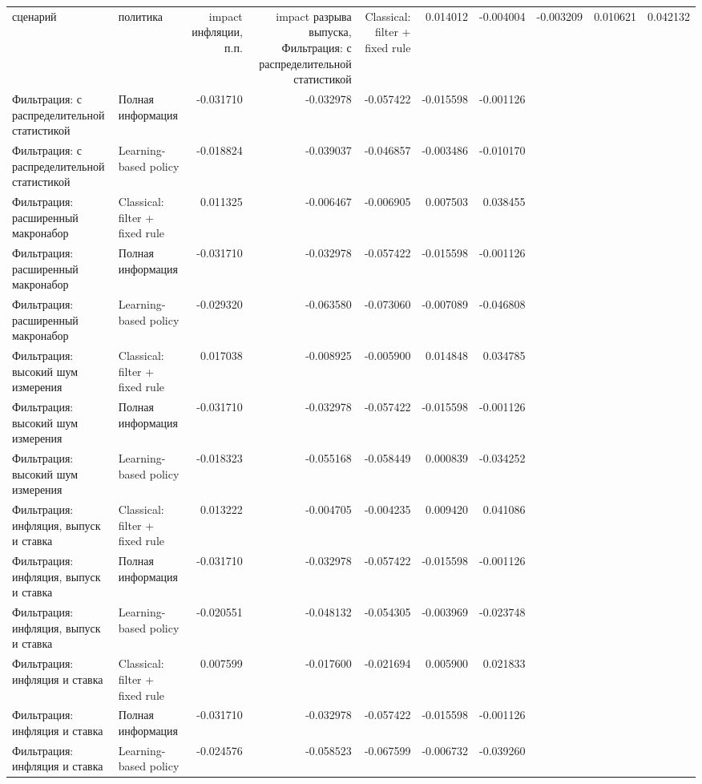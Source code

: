 \begin{tabular}{llrrrrr}
\toprule
сценарий & политика & impact инфляции, п.п. & impact разрыва выпуска, %
\midrule
Фильтрация: с распределительной статистикой & Classical: filter + fixed rule & 0.014012 & -0.004004 & -0.003209 & 0.010621 & 0.042132 \\
Фильтрация: с распределительной статистикой & Полная информация & -0.031710 & -0.032978 & -0.057422 & -0.015598 & -0.001126 \\
Фильтрация: с распределительной статистикой & Learning-based policy & -0.018824 & -0.039037 & -0.046857 & -0.003486 & -0.010170 \\
Фильтрация: расширенный макронабор & Classical: filter + fixed rule & 0.011325 & -0.006467 & -0.006905 & 0.007503 & 0.038455 \\
Фильтрация: расширенный макронабор & Полная информация & -0.031710 & -0.032978 & -0.057422 & -0.015598 & -0.001126 \\
Фильтрация: расширенный макронабор & Learning-based policy & -0.029320 & -0.063580 & -0.073060 & -0.007089 & -0.046808 \\
Фильтрация: высокий шум измерения & Classical: filter + fixed rule & 0.017038 & -0.008925 & -0.005900 & 0.014848 & 0.034785 \\
Фильтрация: высокий шум измерения & Полная информация & -0.031710 & -0.032978 & -0.057422 & -0.015598 & -0.001126 \\
Фильтрация: высокий шум измерения & Learning-based policy & -0.018323 & -0.055168 & -0.058449 & 0.000839 & -0.034252 \\
Фильтрация: инфляция, выпуск и ставка & Classical: filter + fixed rule & 0.013222 & -0.004705 & -0.004235 & 0.009420 & 0.041086 \\
Фильтрация: инфляция, выпуск и ставка & Полная информация & -0.031710 & -0.032978 & -0.057422 & -0.015598 & -0.001126 \\
Фильтрация: инфляция, выпуск и ставка & Learning-based policy & -0.020551 & -0.048132 & -0.054305 & -0.003969 & -0.023748 \\
Фильтрация: инфляция и ставка & Classical: filter + fixed rule & 0.007599 & -0.017600 & -0.021694 & 0.005900 & 0.021833 \\
Фильтрация: инфляция и ставка & Полная информация & -0.031710 & -0.032978 & -0.057422 & -0.015598 & -0.001126 \\
Фильтрация: инфляция и ставка & Learning-based policy & -0.024576 & -0.058523 & -0.067599 & -0.006732 & -0.039260 \\
\bottomrule
\end{tabular}
